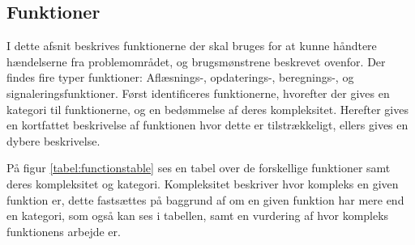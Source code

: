 \subsection{Funktioner}\label{subsec:funktioner}

I dette afsnit beskrives funktionerne der skal bruges for at kunne håndtere hændelserne fra problemområdet, og brugsmønstrene beskrevet ovenfor.
Der findes fire typer funktioner: Aflæsnings-, opdaterings-, beregnings-, og signaleringsfunktioner.\citep{OOA&D2001}
Først identificeres funktionerne, hvorefter der gives en kategori til funktionerne, og en bedømmelse af deres kompleksitet. Herefter gives en kortfattet beskrivelse af funktionen hvor dette er tilstrækkeligt, ellers gives en dybere beskrivelse.

På figur \ref{tabel:functionstable} ses en tabel over de forskellige funktioner samt deres kompleksitet og kategori.
Kompleksitet beskriver hvor kompleks en given funktion er, dette fastsættes på baggrund af om en given funktion har mere end en kategori, som også kan ses i tabellen, samt en vurdering af hvor kompleks funktionens arbejde er.


